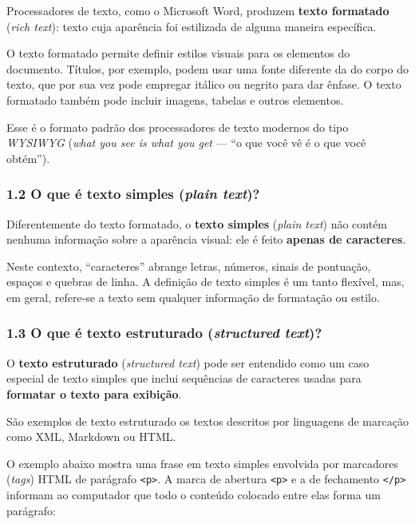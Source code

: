 \documentclass[
  brazilian,
  11pt,
]{article}
\let\oldtexttt\texttt
\renewcommand{\texttt}[1]{{\color{inlink}\oldtexttt{#1}}}
\begin{document}
Processadores de texto, como o Microsoft Word, produzem \textbf{texto
formatado} (\emph{rich text}): texto cuja aparência foi estilizada de
alguma maneira específica.

O texto formatado permite definir estilos visuais para os elementos do
documento. Títulos, por exemplo, podem usar uma fonte diferente da do
corpo do texto, que por sua vez pode empregar itálico ou negrito para
dar ênfase. O texto formatado também pode incluir imagens, tabelas e
outros elementos.

Esse é o formato padrão dos processadores de texto modernos do tipo
\emph{WYSIWYG} (\emph{what you see is what you get} --- ``o que você vê
é o que você obtém'').

\subsubsection{\texorpdfstring{1.2 O que é texto simples (\emph{plain
text})?}{1.2 O que é texto simples (plain text)?}}\label{o-que-uxe9-texto-simples-plain-text}

Diferentemente do texto formatado, o \textbf{texto simples} (\emph{plain
text}) não contém nenhuma informação sobre a aparência visual: ele é
feito \textbf{apenas de caracteres}.

Neste contexto, ``caracteres'' abrange letras, números, sinais de
pontuação, espaços e quebras de linha. A definição de texto simples é um
tanto flexível, mas, em geral, refere‑se a texto sem qualquer informação
de formatação ou estilo.

\subsubsection{\texorpdfstring{1.3 O que é texto estruturado
(\emph{structured
text})?}{1.3 O que é texto estruturado (structured text)?}}\label{o-que-uxe9-texto-estruturado-structured-text}

O \textbf{texto estruturado} (\emph{structured text}) pode ser entendido
como um caso especial de texto simples que inclui sequências de
caracteres usadas para \textbf{formatar o texto para exibição}.

São exemplos de texto estruturado os textos descritos por linguagens de
marcação como XML, Markdown ou HTML.

O exemplo abaixo mostra uma frase em texto simples envolvida por
marcadores (\emph{tags}) HTML de parágrafo
\texttt{\textless{}p\textgreater{}}. A marca de abertura
\texttt{\textless{}p\textgreater{}} e a de fechamento
\texttt{\textless{}/p\textgreater{}} informam ao computador que todo o
conteúdo colocado entre elas forma um parágrafo:
\end{document}
